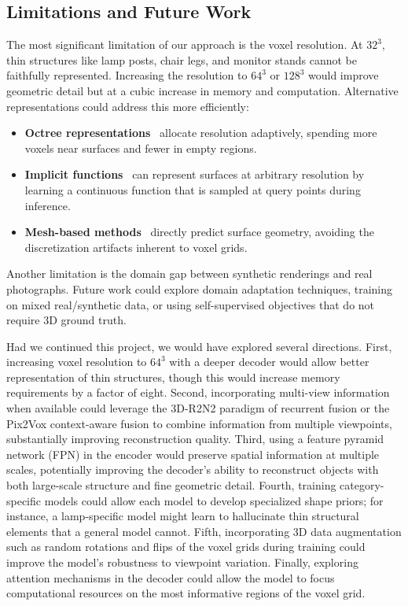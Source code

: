 \documentclass[10pt,twocolumn,letterpaper]{article}
\begin{document}
\subsection{Limitations and Future Work}

The most significant limitation of our approach is the voxel resolution. At $32^3$, thin structures like lamp posts, chair legs, and monitor stands cannot be faithfully represented. Increasing the resolution to $64^3$ or $128^3$ would improve geometric detail but at a cubic increase in memory and computation. Alternative representations could address this more efficiently:

\begin{itemize}
    \item \textbf{Octree representations}~\cite{tatarchenko2017octree} allocate resolution adaptively, spending more voxels near surfaces and fewer in empty regions.
    \item \textbf{Implicit functions}~\cite{mescheder2019occupancy,park2019deepsdf} can represent surfaces at arbitrary resolution by learning a continuous function that is sampled at query points during inference.
    \item \textbf{Mesh-based methods}~\cite{wang2018pixel2mesh} directly predict surface geometry, avoiding the discretization artifacts inherent to voxel grids.
\end{itemize}

Another limitation is the domain gap between synthetic renderings and real photographs. Future work could explore domain adaptation techniques, training on mixed real/synthetic data, or using self-supervised objectives that do not require 3D ground truth.

Had we continued this project, we would have explored several directions. First, increasing voxel resolution to $64^3$ with a deeper decoder would allow better representation of thin structures, though this would increase memory requirements by a factor of eight. Second, incorporating multi-view information when available could leverage the 3D-R2N2 paradigm of recurrent fusion or the Pix2Vox context-aware fusion to combine information from multiple viewpoints, substantially improving reconstruction quality. Third, using a feature pyramid network (FPN) in the encoder would preserve spatial information at multiple scales, potentially improving the decoder's ability to reconstruct objects with both large-scale structure and fine geometric detail. Fourth, training category-specific models could allow each model to develop specialized shape priors; for instance, a lamp-specific model might learn to hallucinate thin structural elements that a general model cannot. Fifth, incorporating 3D data augmentation such as random rotations and flips of the voxel grids during training could improve the model's robustness to viewpoint variation. Finally, exploring attention mechanisms in the decoder could allow the model to focus computational resources on the most informative regions of the voxel grid.
\end{document}
